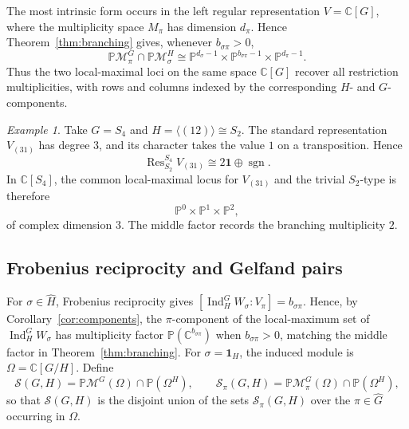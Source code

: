 \documentclass{amsart}
\theoremstyle{remark}
\newtheorem{example}[theorem]{Example}
\newcommand{\C}{\mathbb C}
\begin{document}
 
The most intrinsic form occurs in the left regular representation $V=\C[G]$, where the multiplicity space $M_\pi$ has dimension $d_\pi$.
Hence Theorem~\ref{thm:branching} gives, whenever $b_{\sigma\pi}>0$,
\begin{equation}\label{eq:regular-branching}
 \mathbb P\mathcal M_\pi^G\cap\mathbb P\mathcal M_\sigma^H
 \cong
 \mathbb P^{d_\sigma-1}\times
 \mathbb P^{b_{\sigma\pi}-1}\times
 \mathbb P^{d_\pi-1}.
\end{equation}
Thus the two local-maximal loci on the same space $\C[G]$ recover all restriction multiplicities,
with rows and columns indexed by the corresponding $H$- and $G$-components.
 
\begin{example}\label{ex:S4-S2}
Take $G=S_4$ and $H=\langle(12)\rangle\cong S_2$. The standard representation
$V_{(31)}$ has degree $3$, and its character takes the value $1$ on a transposition. Hence
\[
 \operatorname{Res}_{S_2}^{S_4}V_{(31)}\cong 2\mathbf1\oplus\operatorname{sgn}.
\]
In $\C[S_4]$, the common local-maximal locus for $V_{(31)}$ and the trivial $S_2$-type is therefore
\[
 \mathbb P^0\times\mathbb P^1\times\mathbb P^2,
\]
of complex dimension $3$. The middle factor records the branching multiplicity $2$.
\end{example}
 
\subsection{Frobenius reciprocity and Gelfand pairs}\label{subsec:gelfand}
 
For $\sigma\in\widehat H$, Frobenius reciprocity gives
$[\operatorname{Ind}_H^G W_\sigma:V_\pi]=b_{\sigma\pi}$. Hence, by Corollary~\ref{cor:components}, the
$\pi$-component of the local-maximum set of $\operatorname{Ind}_H^G W_\sigma$ has multiplicity factor
$\mathbb P(\C^{b_{\sigma\pi}})$ when $b_{\sigma\pi}>0$, matching the middle factor in
Theorem~\ref{thm:branching}. For $\sigma=\mathbf1_H$, the induced module is
$\Omega=\C[G/H]$. Define
\[
 \mathcal S(G,H)
 =\mathbb P\mathcal M^G(\Omega)\cap\mathbb P(\Omega^H),
 \qquad
 \mathcal S_\pi(G,H)
 =\mathbb P\mathcal M_\pi^G(\Omega)\cap\mathbb P(\Omega^H),
\]
so that $\mathcal S(G,H)$ is the disjoint union of the sets $\mathcal S_\pi(G,H)$ over the
$\pi\in\widehat G$ occurring in $\Omega$.
 
\end{document}
